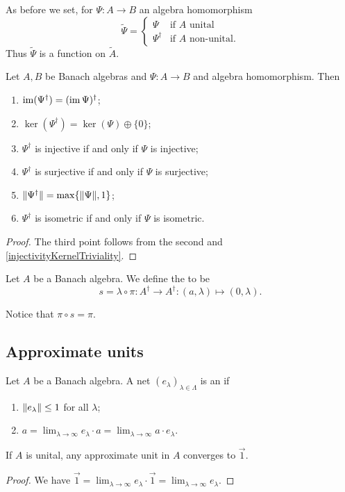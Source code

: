 \begin{definition}
As before we set, for $\Psi: A \to B$ an algebra homomorphism
\[ \tilde{\Psi} = \begin{cases}
\Psi & \text{if $A$ unital} \\
\Psi^\dagger & \text{if $A$ non-unital.}
\end{cases} \]
Thus $\tilde{\Psi}$ is a function on $\tilde{A}$.
\end{definition}

\begin{lemma} \label{DaggerMorphismProperties}
Let $A,B$ be Banach algebras and $\Psi:A\to B$ and algebra homomorphism. Then
\begin{enumerate}
\item $\operatorname{im}(\Psi^\dagger) = (\operatorname{im}\Psi)^\dagger$;
\item $\ker(\Psi^\dagger) = \ker(\Psi)\oplus\{0\}$;
\item $\Psi^\dagger$ is injective \textup{if and only if} $\Psi$ is injective;
\item $\Psi^\dagger$ is surjective \textup{if and only if} $\Psi$ is surjective;
\item $\lVert\Psi^\dagger\rVert = \max\{\lVert\Psi\rVert,1\}$;
\item $\Psi^\dagger$ is isometric \textup{if and only if} $\Psi$ is isometric.
\end{enumerate}
\end{lemma}
\begin{proof}
The third point follows from the second and \ref{injectivityKernelTriviality}.
\end{proof}

\begin{definition}
Let $A$ be a Banach algebra. We define the  to be
\[ s = \lambda\circ \pi: A^\dagger \to A^\dagger: (a,\lambda) \mapsto (0,\lambda). \]
\end{definition}
Notice that $\pi\circ s = \pi$.

\subsection{Approximate units}
\begin{definition}
Let $A$ be a Banach algebra. A net $(e_\lambda)_{\lambda\in\Lambda}$ is an  if
\begin{enumerate}
\item $\lVert e_\lambda\rVert\leq 1$ for all $\lambda$;
\item $a = \lim_{\lambda\to \infty} e_\lambda \cdot a = \lim_{\lambda\to \infty} a \cdot e_\lambda$.
\end{enumerate}
\end{definition}
\begin{lemma}
If $A$ is unital, any approximate unit in $A$ converges to $\vec{1}$.
\end{lemma}
\begin{proof}
We have $\vec{1} = \lim_{\lambda\to\infty}e_\lambda\cdot \vec{1} = \lim_{\lambda\to\infty}e_\lambda$.
\end{proof}

